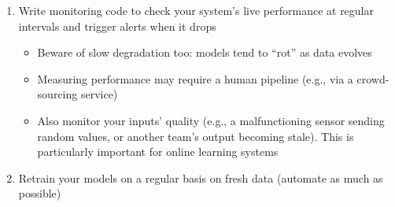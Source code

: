 \documentclass[11pt]{article}
\begin{document}
\begin{enumerate}
\begin{enumerate}
\item Write monitoring code to check your system’s live performance at regular intervals and trigger alerts when it drops
\begin{itemize}
\item Beware of slow degradation too: models tend to “rot” as data evolves
\item Measuring performance may require a human pipeline (e.g., via a crowd-sourcing service)
\item Also monitor your inputs’ quality (e.g., a malfunctioning sensor sending random values, or another team’s output becoming stale). This is particularly important for online learning systems
\end{itemize}
\item Retrain your models on a regular basis on fresh data (automate as much as possible)
\end{enumerate}
\end{enumerate}
\end{document}
